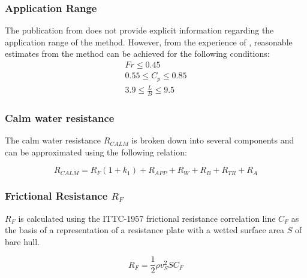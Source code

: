 \subsubsection*{Application Range}

The publication from  does not provide explicit information regarding the application range of the method. However, from the experience of , reasonable estimates from the method can be achieved for the following conditions: \\

\begin{equation}
    \label{eqn:holtrop_cond}
    \begin{gathered}
        Fr \leqslant 0.45 \\
        0.55 \leqslant C_p \leqslant 0.85 \\
        3.9 \leqslant \frac{L}{B} \leqslant 9.5
    \end{gathered}
\end{equation}

\subsubsection{Calm water resistance}\label{sec:Calm_Resistance}

The calm water resistance $R_{CALM}$ is broken down into several components and can be approximated using the following relation:

\begin{equation}\label{eqn:R_calm}
    R_{CALM} = R_F(1+k_1) + R_{APP} + R_W + R_B + R_{TR} + R_A
\end{equation}

\subsubsection*{Frictional Resistance $R_F$}

\textbf{$R_F$} is calculated using the ITTC-1957 frictional resistance correlation line $C_F$ as the basis of a representation of a resistance plate with a wetted surface area $S$ of bare hull. 

\begin{equation}\label{eqn:R_f}
    R_F = \frac{1}{2}\rho v_{S}^2 S C_F 
\end{equation}

